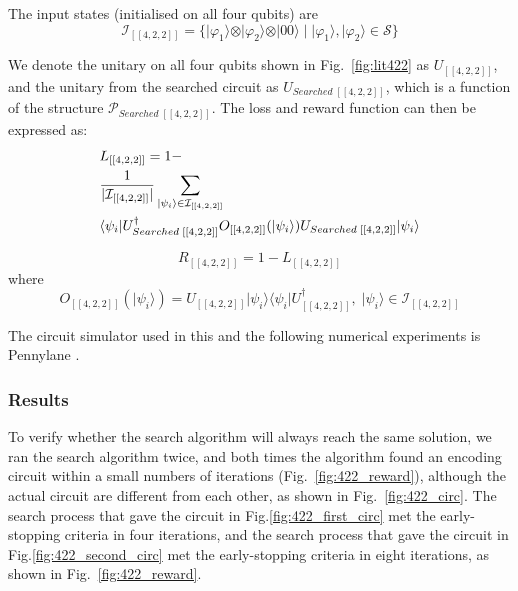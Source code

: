 \documentclass{ieeeaccess}
\begin{document}
The input states (initialised on all four qubits) are
\begin{equation}
    \mathcal{I}_{[[4,2,2]]} = \{\vert \varphi_1 \rangle \otimes \vert \varphi_2 \rangle\otimes\vert 00\rangle \; \vert \; \vert \varphi_1 \rangle, \vert \varphi_2 \rangle \in \mathcal{S}\}
\end{equation}

We denote the unitary on all four qubits shown in Fig.~\ref{fig:lit422} as $U_{[[4,2,2]]}$, and the unitary from the searched circuit as $U_{Searched\;[[4,2,2]]}$, which is a function of the structure $\mathcal{P}_{Searched\;[[4,2,2]]}$. The loss and reward function can then be expressed as:
\begin{equation}
    \begin{split}
        &L_{[[4,2,2]]} = 1-\\ &\frac{1}{\vert \mathcal{I}_{[[4,2,2]]} \vert}\sum_{\vert \psi_i\rangle\in  \mathcal{I}_{[[4,2,2]]}} \\& \langle \psi_i \vert U_{\rm Searched\;[[4,2,2]]}^{\dagger} O_{[[4,2,2]]}(\vert \psi_i\rangle)  U_{\rm Searched\;[[4,2,2]]} \vert \psi_i\rangle
    \end{split}
\end{equation}


\begin{equation}
    R_{[[4,2,2]]} = 1-L_{[[4,2,2]]}
\end{equation}
where
\begin{equation}
    O_{[[4,2,2]]}(\vert \psi_i\rangle) = U_{[[4,2,2]]} \vert \psi_i\rangle \langle \psi_i \vert U_{[[4,2,2]]}^{\dagger},\; \vert \psi_i\rangle\in  \mathcal{I}_{[[4,2,2]]}
\end{equation}

The circuit simulator used in this and the following numerical experiments is Pennylane \cite{bergholm2020pennylane}.
\subsubsection{Results}
To verify whether the search algorithm will always reach the same solution, we ran the search algorithm twice, and both times the algorithm found an encoding circuit within a small numbers of iterations (Fig.~\ref{fig:422_reward}), although the actual circuit are different from each other, as shown in Fig.~\ref{fig:422_circ}. The search process that gave the circuit in Fig.\ref{fig:422_first_circ} met the early-stopping criteria in four iterations, and the search process that gave the circuit in Fig.\ref{fig:422_second_circ} met the early-stopping criteria in eight iterations, as shown in Fig.~\ref{fig:422_reward}.
\end{document}
